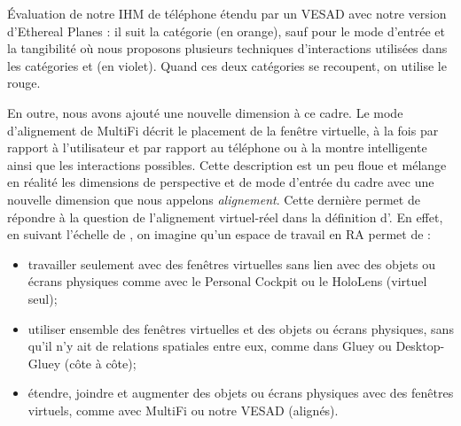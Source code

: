{%
}{
  Évaluation de notre IHM de téléphone étendu par un VESAD avec notre version d'Ethereal Planes : il suit la catégorie  (en orange), sauf pour le mode d'entrée et la tangibilité où nous proposons plusieurs techniques d'interactions utilisées dans les catégories  et  (en violet). Quand ces deux catégories se recoupent, on utilise le rouge.
}

En outre, nous avons ajouté une nouvelle dimension à ce cadre. Le mode d'alignement de MultiFi \citep{Grubert2015} décrit le placement de la fenêtre virtuelle, à la fois par rapport à l'utilisateur et par rapport au téléphone ou à la montre intelligente ainsi que les interactions possibles. Cette description est un peu floue et mélange en réalité les dimensions de perspective et de mode d'entrée du cadre avec une nouvelle dimension que nous appelons \emph{alignement}. Cette dernière permet de répondre à la question de l'alignement virtuel-réel dans la définition d'\cite{Azuma1997}. En effet, en suivant l'échelle de \cite{Milgram1994}, on imagine qu'un espace de travail en RA permet de :
\begin{itemize}
  \item travailler seulement avec des fenêtres virtuelles sans lien avec des objets ou écrans physiques comme avec le Personal Cockpit ou le HoloLens (virtuel seul);
  \item utiliser ensemble des fenêtres virtuelles et des objets ou écrans physiques, sans qu'il n'y ait de relations spatiales entre eux, comme dans Gluey ou Desktop-Gluey (côte à côte);
  \item étendre, joindre et augmenter des objets ou écrans physiques avec des fenêtres virtuels, comme avec MultiFi ou notre VESAD (alignés).
\end{itemize}
\bigskip


